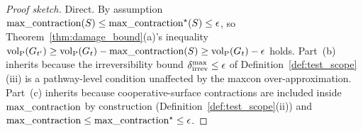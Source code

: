 \begin{proof}[Proof sketch]
Direct.  By assumption $\mathrm{max\_contraction}(S) \leq
\mathrm{max\_contraction}^\star(S) \leq \epsilon$, so
Theorem~\ref{thm:damage_bound}(a)'s inequality ${\operatorname{vol}_{\mathrm{P}}}(G_{t'})
\geq {\operatorname{vol}_{\mathrm{P}}}(G_t) - \mathrm{max\_contraction}(S) \geq {\operatorname{vol}_{\mathrm{P}}}(G_t) -
\epsilon$ holds.  Part~(b) inherits because
the irreversibility bound
$\delta_{\mathrm{irrev}}^{\max} \leq \epsilon$ of
Definition~\ref{def:test_scope}(iii) is a pathway-level
condition unaffected by the maxcon over-approximation.
Part~(c) inherits because cooperative-surface contractions are
included inside $\mathrm{max\_contraction}$ by construction
(Definition~\ref{def:test_scope}(ii)) and
$\mathrm{max\_contraction} \leq \mathrm{max\_contraction}^\star \leq \epsilon$.
\end{proof}
